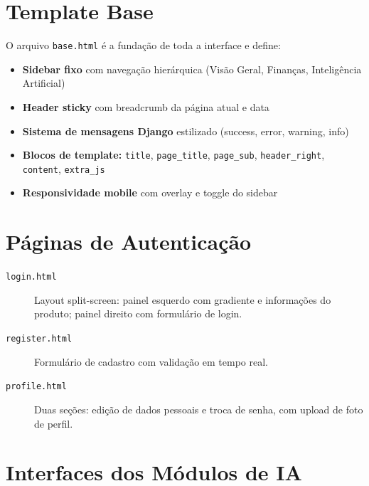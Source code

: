 \documentclass[12pt, a4paper, oneside]{report}
\begin{document}
\section{Template Base}

O arquivo \texttt{base.html} é a fundação de toda a interface e define:

\begin{itemize}
  \item \textbf{Sidebar fixo} com navegação hierárquica (Visão Geral, Finanças, Inteligência Artificial)
  \item \textbf{Header sticky} com breadcrumb da página atual e data
  \item \textbf{Sistema de mensagens Django} estilizado (success, error, warning, info)
  \item \textbf{Blocos de template:} \texttt{title}, \texttt{page\_title}, \texttt{page\_sub}, \texttt{header\_right}, \texttt{content}, \texttt{extra\_js}
  \item \textbf{Responsividade mobile} com overlay e toggle do sidebar
\end{itemize}

\section{Páginas de Autenticação}

\begin{description}
  \item[\texttt{login.html}] Layout split-screen: painel esquerdo com gradiente e informações do produto; painel direito com formulário de login.
  \item[\texttt{register.html}] Formulário de cadastro com validação em tempo real.
  \item[\texttt{profile.html}] Duas seções: edição de dados pessoais e troca de senha, com upload de foto de perfil.
\end{description}

\section{Interfaces dos Módulos de IA}
\end{document}
